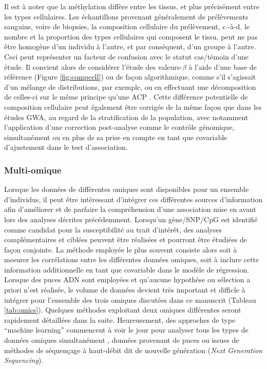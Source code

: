\documentclass[11pt,a4paper,notrimn]{krantz}
\theoremstyle{definition}
\theoremstyle{definition}
\theoremstyle{remark}
\begin{document}
Il est à noter que la méthylation diffère entre les tissus, et plus
précisément entre les types cellulaires. Les échantillons provenant
généralement de prélèvements sanguins, voire de biopsies, la composition
cellulaire du prélèvement, c.-à-d. le nombre et la proportion des types
cellulaires qui composent le tissu, peut ne pas être homogène d'un
individu à l'autre, et par conséquent, d'un groupe à l'autre. Ceci peut
représenter un facteur de confusion avec le statut cas/témoin d'une
étude. Il convient alors de considérer l'étude des valeurs-\(\beta\) à
l'aide d'une base de référence
\citep{houseman_dna_2012, teschendorff_comparison_2017, cardenas_validation_2016}
(Figure \ref{fig:compcell}) ou de façon algorithmique, comme s'il
s'agissait d'un mélange de distributions, par exemple, ou en effectuant
une décomposition de celles-ci sur le même principe qu'une ACP
\citep{houseman_cell-composition_2015, houseman_reference-free_2016, houseman_reference-free_2014}.
Cette différence potentielle de composition cellulaire peut également
être corrigée de la même façon que dans les études GWA, au regard de la
stratification de la population, avec notamment l'application d'une
correction post-analyse comme le contrôle génomique, simultanément ou en
plus de sa prise en compte en tant que covariable d'ajustement dans le
test d'association.

\subsubsection{Multi-omique}\label{multi-omique}

Lorsque les données de différentes omiques sont disponibles pour un
ensemble d'individus, il peut être intéressant d'intégrer ces
différentes sources d'information afin d'améliorer et de parfaire la
compréhension d'une association mise en avant lors des analyses décrites
précédemment. Lorsqu'un gène/SNP/CpG est identifié comme candidat pour
la susceptibilité au trait d'intérêt, des analyses complémentaires et
ciblées peuvent être réalisées et pourront être étudiées de façon
conjointe. La méthode employée le plus souvent consiste alors soit à
mesurer les corrélations entre les différentes données omiques, soit à
inclure cette information additionnelle en tant que covariable dans le
modèle de régression. Lorsque des puces ADN sont employées et qu'aucune
hypothèse ou sélection a priori n'est réalisée, le volume de données
devient très important et difficle à intégrer pour l'ensemble des trois
omiques discutées dans ce manuscrit (Tableau \ref{tab:omics}). Quelques
méthodes exploitant deux omiques différentes seront rapidement
détaillées dans la suite. Heureusement, des approches de type ``machine
learning'' commencent à voir le jour pour analyser tous les types de
données omiques simultanément \citep{lin_machine_2017}, données
provenant de puces ou issues de méthodes de séquençage à haut-débit dit
de nouvelle génération (\emph{Next Generation Sequencing}).
\end{document}
